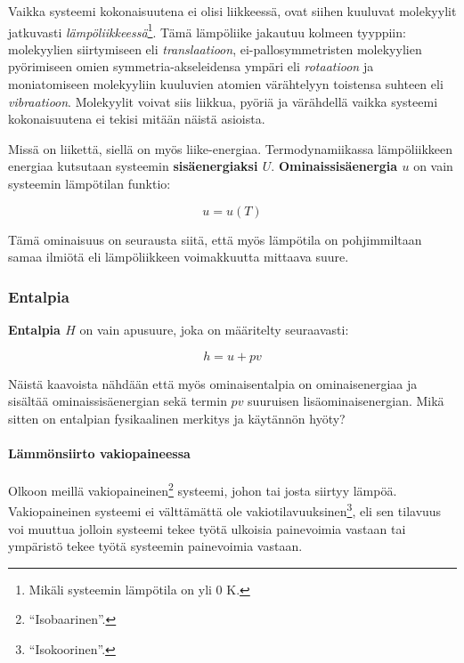 \documentclass[12pt,a4paper,finnish]{book}
\begin{document}
Vaikka systeemi kokonaisuutena ei olisi liikkeessä, ovat siihen kuuluvat molekyylit jatkuvasti 
\textit{lämpöliikkeessä}\footnote{Mikäli systeemin lämpötila on yli 0 K.}. Tämä lämpöliike jakautuu kolmeen tyyppiin: molekyylien 
siirtymiseen eli \textit{translaatioon}, ei-pallosymmetristen molekyylien pyörimiseen omien symmetria-akseleidensa ympäri eli 
\textit{rotaatioon} ja moniatomiseen molekyyliin kuuluvien atomien värähtelyyn toistensa suhteen eli \textit{vibraatioon}. 
Molekyylit voivat siis liikkua, pyöriä ja värähdellä vaikka systeemi kokonaisuutena ei tekisi mitään näistä asioista.

Missä on liikettä, siellä on myös liike-energiaa. Termodynamiikassa lämpöliikkeen energiaa kutsutaan systeemin 
\textbf{sisäenergiaksi $U$}. \textbf{Ominaissisäenergia $u$} on vain systeemin lämpötilan funktio:

\begin{equation}
 u = u(T)
\end{equation}

Tämä ominaisuus on seurausta siitä, että myös lämpötila on pohjimmiltaan samaa ilmiötä eli lämpöliikkeen voimakkuutta mittaava suure.

\subsubsection{Entalpia}

\textbf{Entalpia $H$} on vain apusuure, joka on määritelty seuraavasti:

\begin{equation}
 h = u + pv
\end{equation}

Näistä kaavoista nähdään että myös ominaisentalpia on ominaisenergiaa ja sisältää ominaissisäenergian sekä termin $pv$ 
suuruisen lisäominaisenergian. Mikä sitten on entalpian fysikaalinen merkitys ja käytännön hyöty?


\paragraph{Lämmönsiirto vakiopaineessa}

Olkoon meillä vakiopaineinen\footnote{``Isobaarinen''.} systeemi, johon tai josta siirtyy lämpöä. Vakiopaineinen systeemi 
ei välttämättä ole vakiotilavuuksinen\footnote{``Isokoorinen''.}, eli sen tilavuus voi muuttua jolloin systeemi tekee 
työtä ulkoisia painevoimia vastaan tai ympäristö tekee työtä systeemin painevoimia vastaan. 
\end{document}
